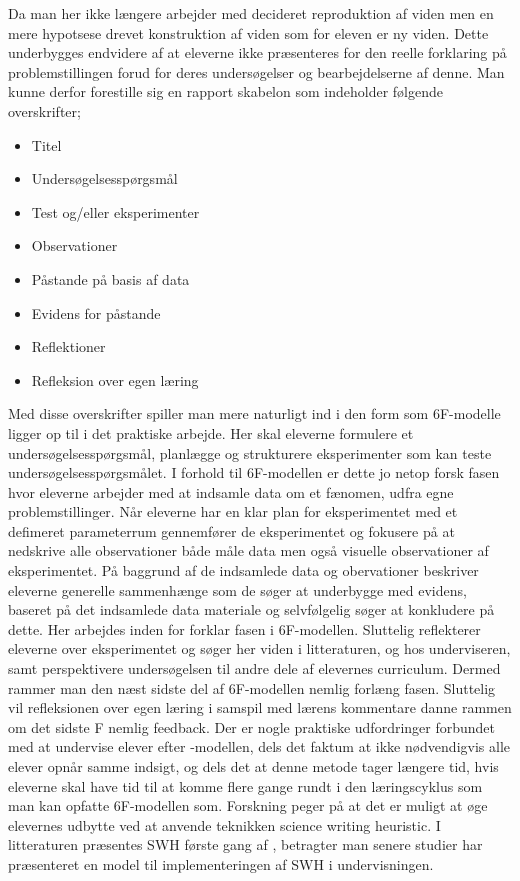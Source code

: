 Da man her ikke længere arbejder med decideret reproduktion af viden men en mere hypotsese drevet konstruktion af viden som for eleven er ny viden. Dette underbygges endvidere af at eleverne ikke præsenteres for den reelle forklaring på problemstillingen forud for deres undersøgelser og bearbejdelserne af denne.  Man kunne derfor forestille sig en rapport skabelon som indeholder følgende overskrifter;
\begin{itemize}
	\item Titel\vspace{-15pt}
	\item Undersøgelsesspørgsmål\vspace{-15pt}
	\item Test og/eller eksperimenter\vspace{-15pt}
	\item Observationer\vspace{-15pt}
	\item Påstande på basis af data\vspace{-15pt}
	\item Evidens for påstande\vspace{-15pt}
	\item Reflektioner\vspace{-15pt}
	\item Refleksion over egen læring
\end{itemize}
Med disse overskrifter spiller man mere naturligt ind i den form som 6F-modelle ligger op til i det praktiske arbejde. Her skal eleverne formulere et undersøgelsesspørgsmål, planlægge og strukturere eksperimenter som kan teste undersøgelsesspørgsmålet. I forhold til 6F-modellen er dette jo netop forsk fasen hvor eleverne arbejder med at indsamle data om et fænomen, udfra egne problemstillinger. Når eleverne har en klar plan for eksperimentet med et defimeret parameterrum gennemfører de eksperimentet og fokusere på at nedskrive alle observationer både måle data men også visuelle observationer af eksperimentet. På baggrund af de indsamlede data og obervationer beskriver eleverne generelle sammenhænge som de søger at underbygge med evidens, baseret på det indsamlede data materiale og selvfølgelig søger at konkludere på dette. Her arbejdes inden for forklar fasen i 6F-modellen. Sluttelig reflekterer eleverne over eksperimentet og søger her viden i litteraturen, og hos underviseren, samt perspektivere undersøgelsen til andre dele af elevernes curriculum. Dermed rammer man den næst sidste del af 6F-modellen nemlig forlæng fasen. Sluttelig vil refleksionen over egen læring i samspil med lærens kommentare danne rammen om det sidste F nemlig feedback. Der er nogle praktiske udfordringer forbundet med at undervise elever efter \ib-modellen, dels det faktum at ikke nødvendigvis alle elever opnår samme indsigt, og dels det at denne metode tager længere tid, hvis eleverne skal have tid til at komme flere gange rundt i den læringscyklus som man kan opfatte 6F-modellen som. Forskning peger på at det er muligt at øge elevernes udbytte ved at anvende teknikken science writing heuristic. I litteraturen præsentes SWH første gang af \citep{Keys1999}, betragter man senere studier har \citep{Hand2004} præsenteret en model til implementeringen af SWH i undervisningen.
